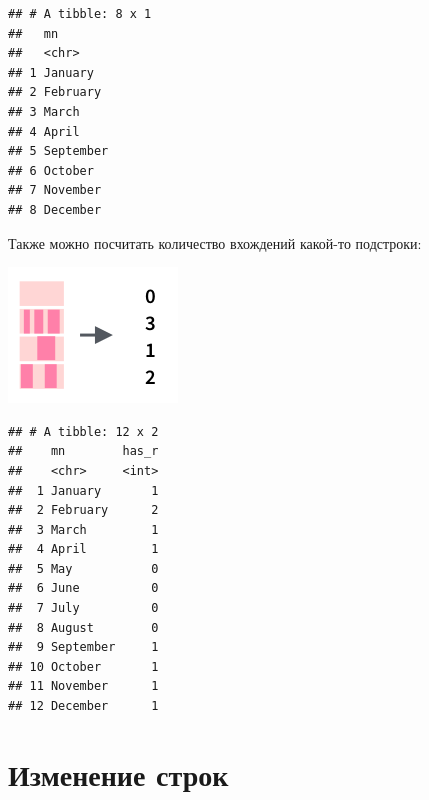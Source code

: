 \documentclass[
]{book}
\newenvironment{Shaded}{\begin{snugshade}}{\end{snugshade}}
\newcommand{\DataTypeTok}[1]{\textcolor[rgb]{0.13,0.29,0.53}{#1}}
\newcommand{\KeywordTok}[1]{\textcolor[rgb]{0.13,0.29,0.53}{\textbf{#1}}}
\newcommand{\NormalTok}[1]{#1}
\newcommand{\OperatorTok}[1]{\textcolor[rgb]{0.81,0.36,0.00}{\textbf{#1}}}
\newcommand{\StringTok}[1]{\textcolor[rgb]{0.31,0.60,0.02}{#1}}
\begin{document}
\begin{Shaded}
\end{Shaded}

\begin{verbatim}
## # A tibble: 8 x 1
##   mn       
##   <chr>    
## 1 January  
## 2 February 
## 3 March    
## 4 April    
## 5 September
## 6 October  
## 7 November 
## 8 December
\end{verbatim}

Также можно посчитать количество вхождений какой-то подстроки:

\includegraphics{images/5.06_str_count.png}

\begin{Shaded}
\end{Shaded}

\begin{verbatim}
## # A tibble: 12 x 2
##    mn        has_r
##    <chr>     <int>
##  1 January       1
##  2 February      2
##  3 March         1
##  4 April         1
##  5 May           0
##  6 June          0
##  7 July          0
##  8 August        0
##  9 September     1
## 10 October       1
## 11 November      1
## 12 December      1
\end{verbatim}

\hypertarget{ux438ux437ux43cux435ux43dux435ux43dux438ux435-ux441ux442ux440ux43eux43a}{%
\section{Изменение строк}\label{ux438ux437ux43cux435ux43dux435ux43dux438ux435-ux441ux442ux440ux43eux43a}}
\end{document}
